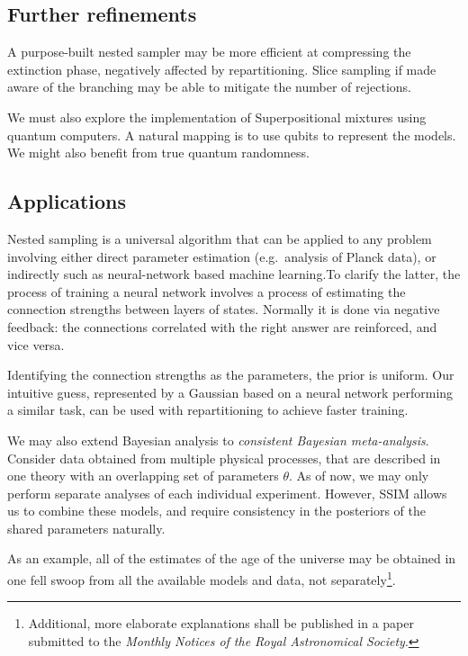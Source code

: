 \documentclass[usenatbib]{mnras}
\begin{document}
\subsection{Further refinements}\label{sec:org8314ddf}

A purpose-built nested sampler may be more efficient at compressing
the extinction phase, negatively affected by repartitioning. Slice
sampling if made aware of the branching may be able to mitigate the
number of rejections. 

We must also explore the implementation of Superpositional mixtures
using quantum computers. A natural mapping is to use qubits to
represent the models. We might also benefit from true quantum
randomness.



\subsection{Applications}\label{sec:orgc67317e}
Nested sampling is a universal algorithm that can be applied to any
problem involving either direct parameter estimation (e.g.~analysis of
Planck data), or indirectly such as neural-network based machine
learning.To clarify the latter, the process of training a neural
network involves a process of estimating the connection strengths
between layers of states. Normally it is done via negative feedback:
the connections correlated with the right answer are reinforced, and
vice versa.

Identifying the connection strengths as the parameters, the prior is
uniform. Our intuitive guess, represented by a Gaussian based on a
neural network performing a similar task, can be used with
repartitioning to achieve faster training.

We may also extend Bayesian analysis to \emph{consistent Bayesian
  meta-analysis}. Consider data obtained from multiple physical
processes, that are described in one theory with an overlapping set of
parameters $\theta$. As of now, we may only perform separate analyses
of each individual experiment. However, SSIM allows us to combine
these models, and require consistency in the posteriors of the shared
parameters naturally.

As an example, all of the estimates of the age of the universe may be
obtained in one fell swoop from all the available models and data, not
separately\footnote{Additional, more elaborate explanations shall be
  published in a paper submitted to the \emph{Monthly Notices of the
    Royal Astronomical Society}.}.
\end{document}
